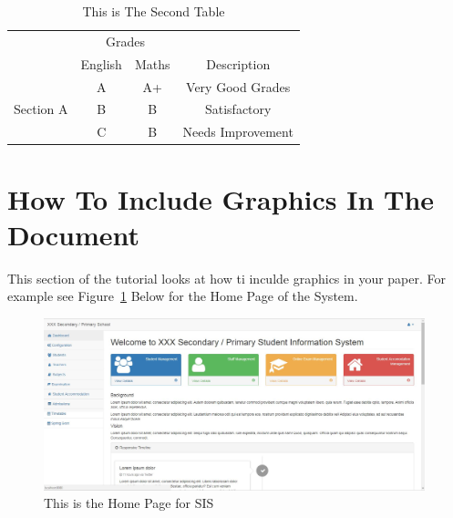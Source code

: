 \documentclass{article}
\begin{document}
		\begin{table}[htbp]
		\caption{This is The Second Table}
		\label{second_table}
		\begin{center}
			
			\begin{tabular}{|c|c|c|c|}
				\hline
				& \multicolumn{2}{c|}{Grades} &\\
				\cline{2-3}
				 & English & Maths &  Description  \\
				\hline
				\multirow{3}{*}{Section A}
						& A & A+ & Very Good Grades\\
						& B & B & Satisfactory \\
						& C & B & Needs Improvement\\	
				\hline
			\end{tabular}
			
		\end{center}
	\end{table}

	\section{How To Include Graphics In The Document}
	This section of the tutorial looks at how ti inculde graphics in your paper. For example see Figure~\ref{sis_home} Below for the Home Page of the System.
	
	\begin{figure}[htbp]
		\begin{center}
			
			\includegraphics[height=5cm]{sis.jpg}
			\caption{This is the Home Page for SIS}
			\label{sis_home}
			
		\end{center}
	\end{figure}
\end{document}
